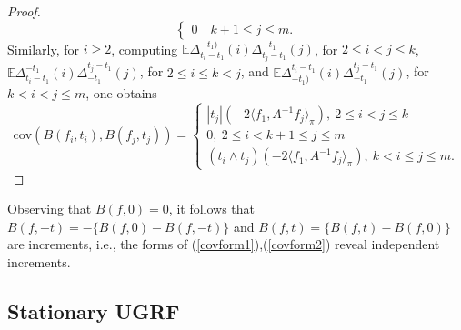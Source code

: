 \documentclass[11pt]{article}
\numberwithin{equation}{section}
\theoremstyle{definition}
\theoremstyle{remark}
\theoremstyle{definition}
\begin{document}
\begin{proof}
\begin{equation}
\begin{cases}
 0\quad k+1\le j\le m.
   \end{cases}
  \end{equation}
Similarly, for $i\ge 2$, computing
 $\mathbb{E}\Delta^{-t_1)}_{t_i-t_1}(i)\Delta^{-t_1}_{t_j-t_1}(j)$, 
 for $2\le i<j\le k$,
 $\mathbb{E}\Delta^{-t_1}_{t_i-t_1}(i)\Delta^{t_j-t_1}_{-t_1}(j)$, 
 for $2\le i\le k<j$, and
 $\mathbb{E}\Delta^{t_i-t_1}_{-t_1)}(i)\Delta^{t_j-t_1}_{-t_1}(j)$, 
 for $k<i<j\le m$,
 one obtains
\begin{equation}\label{covform2}
  \text{cov}(B(f_i,t_i),B(f_j,t_j))
  =
 \begin{cases}|t_j|
  (-2\langle f_1, A^{-1}f_j\rangle_\pi),\  2\le i<j\le k\\
0,\  2\le i <k+1\le j\le m\\
 (t_i\wedge t_j)
  (-2\langle f_1, A^{-1}f_j\rangle_\pi),\ k < i\le j\le m.
  \end{cases}
    \end{equation}
 \end{proof}
Observing that $B(f,0)=0$, it follows
 that $B(f,-t) = -\{B(f,0)-B(f,-t)\}$ and 
 $B(f,t)= \{B(f,t)-B(f,0)\}$ are increments, i.e.,
the forms of (\ref{covform1}),(\ref{covform2}) reveal independent 
 increments. 
 


\subsection{Stationary UGRF}
\end{document}
